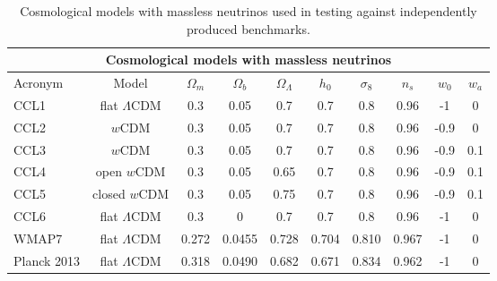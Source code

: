 
\begin{table*}[t]
  \centering
  \begin{tabular}{ l c | c c c c c c c c }
    \hline
    \multicolumn{10}{|c|}{Cosmological models with massless neutrinos} \\
    \hline
    \hline
    Acronym & Model & $\Omega_m$ & $\Omega_b$ & $\Omega_\Lambda$ & $h_0$ & $\sigma_8$ & $n_s$ & $w_0$ & $w_a$ \\
    \hline
    CCL1 & flat $\Lambda$CDM & 0.3 & 0.05 & 0.7 & 0.7 & 0.8 & 0.96 & -1 & 0 \\
    CCL2 & $w$CDM & 0.3 & 0.05 & 0.7 & 0.7 & 0.8 & 0.96 & -0.9 & 0  \\
    CCL3 & $w$CDM & 0.3 & 0.05 & 0.7 & 0.7 & 0.8 & 0.96 & -0.9 & 0.1  \\
    CCL4 & open $w$CDM & 0.3 & 0.05 & 0.65 & 0.7 & 0.8 & 0.96 & -0.9 & 0.1  \\
    CCL5 & closed $w$CDM & 0.3 & 0.05 & 0.75 & 0.7 & 0.8 & 0.96 & -0.9 & 0.1  \\
    CCL6 & flat $\Lambda$CDM & 0.3 & 0 & 0.7 & 0.7 & 0.8 & 0.96 & -1 & 0 \\
    WMAP7 & flat $\Lambda$CDM & 0.272 & 0.0455 & 0.728 & 0.704 & 0.810 & 0.967 & -1 & 0 \\
    Planck 2013 & flat $\Lambda$CDM & 0.318 & 0.0490 & 0.682 & 0.671 & 0.834 & 0.962 & -1 & 0 \\
    \hline
  \end{tabular}
  \caption{Cosmological models with massless neutrinos used in testing \ccl against independently produced benchmarks.}
  \label{tab:cosmologies}
\end{table*}
